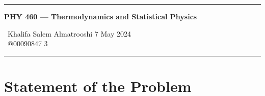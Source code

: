 \documentclass{article}
\begin{document}
	
	\begin{center}
		\hrule
		\vspace{0.4cm}
		\textbf { \large PHY 460 --- Thermodynamics and Statistical Physics}
		\vspace{0.4cm}
	\end{center}
		 \ Khalifa Salem Almatrooshi \hspace{\fill}  7 May 2024 \\
		 \ @00090847 \hspace{\fill}  3 \\
		\hrule	
	
	\section*{Statement of the Problem}
	
\end{document}
